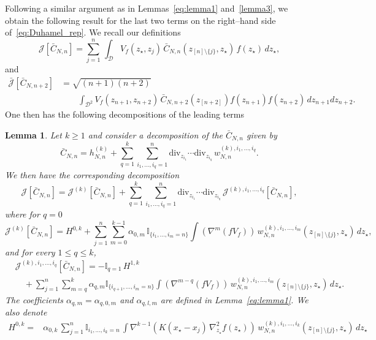 \documentclass[pdflatex,sn-mathphys-num]{sn-jnl}
\theoremstyle{thmstyleone}%
\theoremstyle{thmstyletwo}%
\theoremstyle{thmstylethree}%
\newtheorem{lemma}{Lemma}
\begin{document}
Following a similar argument as in Lemmas~\ref{eq:lemma1} and~\ref{lemma3}, we obtain the following result for the last two terms on the right--hand side of~\eqref{eq:Duhamel_rep}. We recall our definitions
\[
\mathcal J[\bar C_{N,n}]=\sum_{j=1}^n\,\int_{\mathcal{D}} V_f(z_\star,z_j)\,\bar C_{N,n}(z_{[n]\setminus \{j\}},z_\star)\,f(z_\star)\,dz_\star,
\]
and
\[
\begin{aligned}
\bar{\mathcal J}[\bar C_{N,n+2}]
&=\sqrt{(n+1)(n+2)}\\
&\qquad 
\int_{\mathcal D^2}
V_f(z_{n+1},z_{n+2}) \,
\bar C_{N,n+2}(z_{[n+2]}) 
f(z_{n+1})f(z_{n+2})\,
dz_{n+1}dz_{n+2}.
\end{aligned}
\]
One then has the following decompositions of the leading terms
\begin{lemma}\label{lemma2}
Let \(k\geq 1\) and consider a decomposition of the $\bar C_{N,n}$ given by
\begin{equation*}%
\bar C_{N,n}
= h^{(k)}_{N,n}
+ \sum_{q=1}^k \sum_{i_1,\dots,i_q=1}^n
\mathrm{div}_{z_{i_1}}\cdots \mathrm{div}_{z_{i_q}}
\, w^{(k),i_1,\dots,i_q}_{N,n}.
\end{equation*} 
We then have the corresponding decomposition
\begin{equation}\label{J_decomposition}
\mathcal J[\bar C_{N,n}]
= \mathcal J^{(k)}[\bar C_{N,n}]
+ \sum_{q=1}^k \sum_{i_1,\dots,i_q=1}^n
\mathrm{div}_{z_{i_1}}\cdots \mathrm{div}_{z_{i_q}}
\,\mathcal J^{(k),i_1,\dots,i_q}[\bar C_{N,n}],
\end{equation}
where for \(q=0\)
\[
\mathcal J^{(k)}[\bar C_{N,n}]
= H^{0,k}+\sum_{j=1}^n \sum_{m=0}^{k-1 }\alpha_{0,m}\, \mathbb{I}_{\{i_{1},\ldots, i_{m}=n \}} 
\int
\left(\nabla^{m} \left(fV_f \right) \right)\,
w^{(k),i_1,\dots,i_m}_{N,n}(z_{[n]\setminus\{j\}},z_\star)
\,dz_\star,
\]
and for every \(1\le q\le k\),
\[
\begin{split}
&\mathcal J^{(k),i_1,\dots,i_q}[\bar C_{N,n}]
= -\mathbb{I}_{q=1}\,H^{1,k}\\
&\quad+\sum_{j=1}^n \sum_{m=q}^k \alpha_{q,m}
\mathbb{I}_{\{i_{q+1},\ldots, i_{m}=n \}} 
\int
\left(\nabla^{m-q} \left(fV_f \right) \right)\,
w^{(k),i_1,\dots,i_m}_{N,n}(z_{[n]\setminus\{j\}},z_\star)
\,dz_\star.
\end{split}
\]
The coefficients $\alpha_{q,m}=\alpha_{q,0,m}$ and $\alpha_{q,l,m}$ are defined in Lemma~\ref{eq:lemma1}. We also denote 
\[\begin{split}
H^{0,k}=&\alpha_{0,k}\,\sum_{j=1}^n \mathbb{I}_{i_1,\ldots,i_k=n}\,\int \nabla^{k-1}(K(x_\star-x_j)\,\nabla_{z_\star}^2 f(z_\star))\,w^{(k),i_1,...,i_k}_{N,n}(z_{[n]\setminus\{j\}}, z_\star)\,dz_\star\\

\end{split}\]
\end{lemma}
\end{document}
